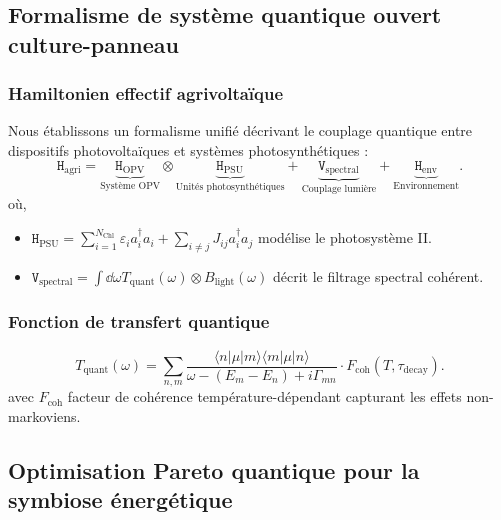 \documentclass[12pt, a4paper]{article}
\begin{document}
\subsection{Formalisme de système quantique ouvert culture-panneau}

\subsubsection{Hamiltonien effectif agrivoltaïque}

Nous établissons un formalisme unifié décrivant le couplage quantique entre dispositifs photovoltaïques et systèmes photosynthétiques :
\begin{equation}
\mathtt{H}_{\text{agri}} = \underbrace{\mathtt{H}_{\text{OPV}}}_{\text{Système OPV}} \otimes \underbrace{\mathtt{H}_{\text{PSU}}}_{\text{Unités photosynthétiques}} + \underbrace{\mathtt{V}_{\text{spectral}}}_{\text{Couplage lumière}} + \underbrace{\mathtt{H}_{\text{env}}}_{\text{Environnement}}.
\end{equation}
où,
\begin{itemize}
    \item $\mathtt{H}_{\text{PSU}} = \sum_{i=1}^{N_{\text{Chl}}} \varepsilon_i a_i^\dagger a_i + \sum_{i\neq j} J_{ij} a_i^\dagger a_j$ modélise le photosystème II.

    \item $\mathtt{V}_{\text{spectral}} = \int \dd{\omega} T_{\text{quant}}(\omega) \otimes B_{\text{light}}(\omega)$ décrit le filtrage spectral cohérent.
\end{itemize}

\subsubsection{Fonction de transfert quantique}

\begin{equation}
T_{\text{quant}}(\omega) = \sum_{n,m} \frac{\langle n | \mu | m \rangle \langle m | \mu | n \rangle}{\omega - (E_m - E_n) + i\Gamma_{mn}} \cdot F_{\text{coh}}(T, \tau_{\text{decay}}).
\end{equation}
avec $F_{\text{coh}}$ facteur de cohérence température-dépendant capturant les effets non-markoviens.

\subsection{Optimisation Pareto quantique pour la symbiose énergétique}
\end{document}
